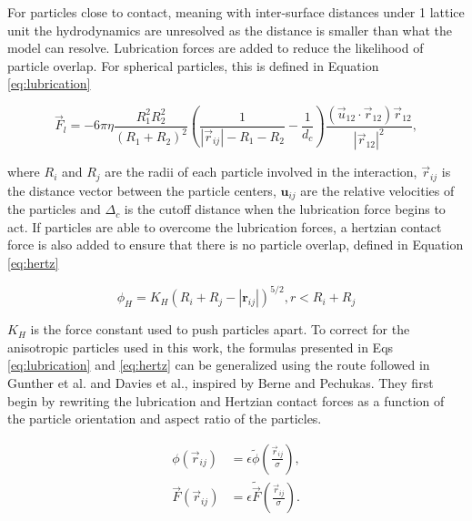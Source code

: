 For particles close to contact, meaning with inter-surface distances under 1 lattice unit the hydrodynamics are unresolved as the
distance is smaller than what the model can resolve. Lubrication forces are added to reduce the likelihood of particle overlap. For 
spherical particles, this is defined in Equation \eqref{eq:lubrication}

\begin{equation}
    \vec{F}_l = -6 \pi \eta \frac{R_1^2 R_2^2}{\left(R_1+R_2\right)^2}\left(\frac{1}{|\vec{r}_{ij}|-R_1-R_2}-\frac{1}{d_c}\right) \frac{\left(\vec{u}_{12}\cdot\vec{r}_{12}\right)\vec{r}_{12}}{|\vec{r}_{12}|^2} ,%
    \label{eq:lubrication}
\end{equation}

where $R_i$ and $R_j$ are the radii of each particle involved in the interaction, $\vec{r}_{ij}$ is the distance
vector between the particle centers, $\mathbf{u}_{ij}$ are the relative velocities of the particles and $\Delta_c$ 
is the cutoff distance when the lubrication force begins to act. If particles are able to overcome the lubrication forces, 
a hertzian contact force is also added to ensure that there is no particle overlap, defined in Equation \eqref{eq:hertz}

\begin{equation}
    \phi_{H} = K_{H}(R_i + R_j - |\mathbf{r}_{ij}|)^{5/2}, r < R_i + R_j
    \label{eq:hertz}
\end{equation}

$K_H$ is the force constant used to push particles apart. To correct for the anisotropic particles used in this work, 
the formulas presented in Eqs \ref{eq:lubrication} and \ref{eq:hertz} can be generalized using the route followed 
in Gunther et al. and Davies et al., inspired by Berne and Pechukas. \cite{gunther_timescales_2014, davies_interface_2014} 
They first begin by rewriting the lubrication and Hertzian contact forces as a function of the particle orientation and 
aspect ratio of the particles.

\begin{equation}
    \begin{split}
    \phi(\vec{r}_{ij}) &= {\epsilon} \tilde{\phi}\left(\frac{\vec{r}_{ij}}{{\sigma}}\right) , \\
    \vec{F}(\vec{r}_{ij}) &= {\epsilon} \tilde{\vec{F}}\left(\frac{\vec{r}_{ij}}{{\sigma}}\right) .
    \end{split}
\end{equation}

